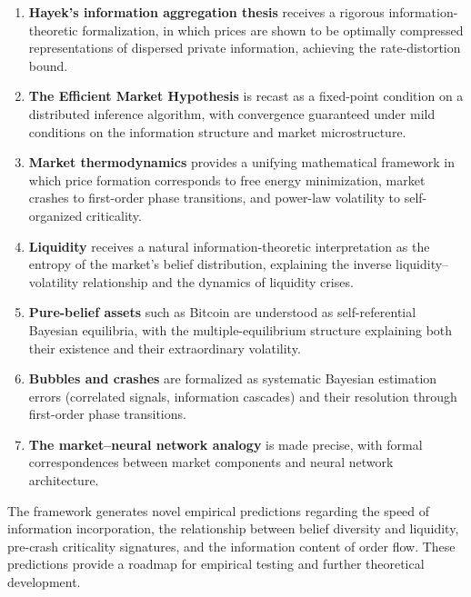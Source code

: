 \documentclass[12pt,a4paper]{article}
\theoremstyle{definition}
\begin{document}
\begin{enumerate}[label=(\roman*)]
    \item \textbf{Hayek's information aggregation thesis} receives a rigorous information-theoretic formalization, in which prices are shown to be optimally compressed representations of dispersed private information, achieving the rate-distortion bound.
    
    \item \textbf{The Efficient Market Hypothesis} is recast as a fixed-point condition on a distributed inference algorithm, with convergence guaranteed under mild conditions on the information structure and market microstructure.
    
    \item \textbf{Market thermodynamics} provides a unifying mathematical framework in which price formation corresponds to free energy minimization, market crashes to first-order phase transitions, and power-law volatility to self-organized criticality.
    
    \item \textbf{Liquidity} receives a natural information-theoretic interpretation as the entropy of the market's belief distribution, explaining the inverse liquidity--volatility relationship and the dynamics of liquidity crises.
    
    \item \textbf{Pure-belief assets} such as Bitcoin are understood as self-referential Bayesian equilibria, with the multiple-equilibrium structure explaining both their existence and their extraordinary volatility.
    
    \item \textbf{Bubbles and crashes} are formalized as systematic Bayesian estimation errors (correlated signals, information cascades) and their resolution through first-order phase transitions.
    
    \item \textbf{The market--neural network analogy} is made precise, with formal correspondences between market components and neural network architecture.
\end{enumerate}

The framework generates novel empirical predictions regarding the speed of information incorporation, the relationship between belief diversity and liquidity, pre-crash criticality signatures, and the information content of order flow. These predictions provide a roadmap for empirical testing and further theoretical development.
\end{document}
